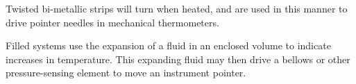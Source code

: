 Twisted bi-metallic strips will turn when heated, and are used in this manner to drive pointer needles in mechanical thermometers.

\vskip 10pt

Filled systems use the expansion of a fluid in an enclosed volume to indicate increases in temperature.  This expanding fluid may then drive a bellows or other pressure-sensing element to move an instrument pointer.





